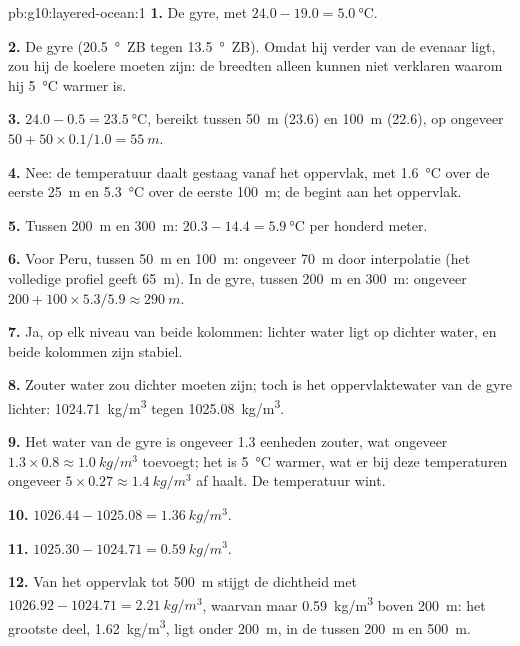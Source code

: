 \begin{solution}{pb:g10:layered-ocean:1}
\textbf{1.} De gyre, met $24.0 - 19.0 = \qty{5.0}{\degreeCelsius}$.

\textbf{2.} De gyre (\qty{20.5}{\degree}~ZB tegen \qty{13.5}{\degree}~ZB).
Omdat hij verder van de evenaar ligt, zou hij de koelere moeten zijn: de breedten
alleen kunnen niet verklaren waarom hij \qty{5}{\degreeCelsius} warmer is.

\textbf{3.} $24.0 - 0.5 = \qty{23.5}{\degreeCelsius}$, bereikt tussen
\qty{50}{m} (23.6) en \qty{100}{m} (22.6), op ongeveer $50 + 50 \times
0.1/1.0 = \qty{55}{m}$.

\textbf{4.} Nee: de temperatuur daalt gestaag vanaf het oppervlak, met
\qty{1.6}{\degreeCelsius} over de eerste \qty{25}{m} en \qty{5.3}{\degreeCelsius}
over de eerste \qty{100}{m}; de  begint aan het oppervlak.

\textbf{5.} Tussen \qty{200}{m} en \qty{300}{m}: $20.3 - 14.4 =
\qty{5.9}{\degreeCelsius}$ per honderd meter.

\textbf{6.} Voor Peru, tussen \qty{50}{m} en \qty{100}{m}: ongeveer
\qty{70}{m} door interpolatie (het volledige profiel geeft \qty{65}{m}). In de
gyre, tussen \qty{200}{m} en \qty{300}{m}: ongeveer $200 + 100 \times 5.3/5.9
\approx \qty{290}{m}$.

\textbf{7.} Ja, op elk niveau van beide kolommen: lichter water ligt op dichter
water, en beide kolommen zijn stabiel.

\textbf{8.} Zouter water zou dichter moeten zijn; toch is het oppervlaktewater
van de gyre lichter: \qty{1024.71}{kg/m^3} tegen \qty{1025.08}{kg/m^3}.

\textbf{9.} Het water van de gyre is ongeveer 1.3 eenheden zouter, wat ongeveer
$1.3 \times 0.8 \approx \qty{1.0}{kg/m^3}$ toevoegt; het is \qty{5}{\degreeCelsius}
warmer, wat er bij deze temperaturen ongeveer
$5 \times 0.27 \approx \qty{1.4}{kg/m^3}$ af haalt. De temperatuur wint.

\textbf{10.} $1026.44 - 1025.08 = \qty{1.36}{kg/m^3}$.

\textbf{11.} $1025.30 - 1024.71 = \qty{0.59}{kg/m^3}$.

\textbf{12.} Van het oppervlak tot \qty{500}{m} stijgt de dichtheid met
$1026.92 - 1024.71 = \qty{2.21}{kg/m^3}$, waarvan maar \qty{0.59}{kg/m^3}
boven \qty{200}{m}: het grootste deel, \qty{1.62}{kg/m^3}, ligt onder
\qty{200}{m}, in de  tussen \qty{200}{m} en \qty{500}{m}.


\end{solution}
